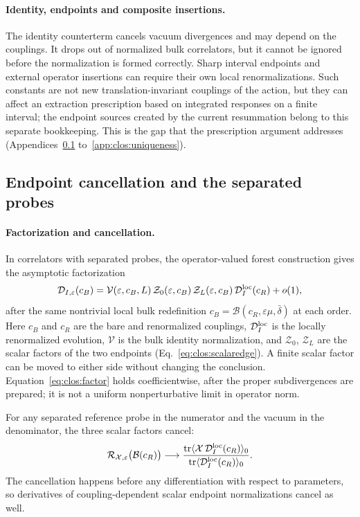 \documentclass[11pt,a4paper]{article}
\numberwithin{equation}{section}
\newcommand{\db}{\bar\delta}
\begin{document}
\paragraph{Identity, endpoints and composite insertions.} The identity counterterm cancels vacuum divergences and may
depend on the couplings. It drops out of normalized bulk correlators, but it cannot be ignored before the normalization
is formed correctly. Sharp interval endpoints and external operator insertions can require their own local
renormalizations. Such constants are not new translation-invariant couplings of the action, but they can affect an
extraction prescription based on integrated responses on a finite interval; the endpoint sources created by the
current resummation belong to this separate bookkeeping. This is the gap that the prescription argument addresses
(Appendices~\ref{app:clos:endpoint} to~\ref{app:clos:uniqueness}).

\subsection{Endpoint cancellation and the separated probes}\label{app:clos:endpoint}
\paragraph{Factorization and cancellation.} In correlators with separated probes, the operator-valued forest
construction gives the asymptotic factorization
\begin{equation}
 \mathcal D_{I,\varepsilon}(c_B)=\mathcal V(\varepsilon,c_B,L)\,\mathcal Z_0(\varepsilon,c_B)\,
 \mathcal Z_L(\varepsilon,c_B)\,\mathcal D_I^{\rm loc}(c_R)+o(1),
 \label{eq:clos:factor}
\end{equation}
after the same nontrivial local bulk redefinition $c_B=\mathcal B(c_R,\varepsilon\mu,\db)$ at each order. Here $c_B$
and $c_R$ are the bare and renormalized couplings, $\mathcal D_I^{\rm loc}$ is the locally renormalized evolution,
$\mathcal V$ is the bulk identity normalization, and $\mathcal Z_0$, $\mathcal Z_L$ are the scalar factors of the two
endpoints (Eq.~\eqref{eq:clos:scalaredge}). A finite scalar factor can be moved to either side without changing the
conclusion. Equation~\eqref{eq:clos:factor} holds coefficientwise, after the proper subdivergences are prepared; it is
not a uniform nonperturbative limit in operator norm.

For any separated reference probe in the numerator and the vacuum in the denominator, the three scalar factors cancel:
\begin{equation}
 \mathcal R_{\mathcal X,\varepsilon}\bigl(\mathcal B(c_R)\bigr)\longrightarrow
 \frac{\operatorname{tr}\langle\mathcal X\,\mathcal D_I^{\rm loc}(c_R)\rangle_0}
 {\operatorname{tr}\langle\mathcal D_I^{\rm loc}(c_R)\rangle_0}.
 \label{eq:clos:cancel}
\end{equation}
The cancellation happens before any differentiation with respect to parameters, so derivatives of coupling-dependent
scalar endpoint normalizations cancel as well.
\end{document}
